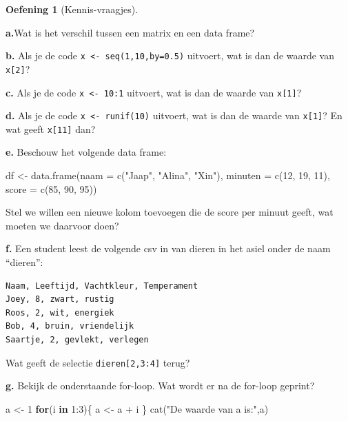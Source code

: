 \documentclass[
  a4paper,
]{scrbook}
\newenvironment{Shaded}{\begin{snugshade}}{\end{snugshade}}
\newcommand{\AttributeTok}[1]{\textcolor[rgb]{0.40,0.45,0.13}{#1}}
\newcommand{\ControlFlowTok}[1]{\textcolor[rgb]{0.00,0.23,0.31}{\textbf{#1}}}
\newcommand{\DecValTok}[1]{\textcolor[rgb]{0.68,0.00,0.00}{#1}}
\newcommand{\FunctionTok}[1]{\textcolor[rgb]{0.28,0.35,0.67}{#1}}
\newcommand{\NormalTok}[1]{\textcolor[rgb]{0.00,0.23,0.31}{#1}}
\newcommand{\OtherTok}[1]{\textcolor[rgb]{0.00,0.23,0.31}{#1}}
\newcommand{\SpecialCharTok}[1]{\textcolor[rgb]{0.37,0.37,0.37}{#1}}
\newcommand{\StringTok}[1]{\textcolor[rgb]{0.13,0.47,0.30}{#1}}
\theoremstyle{definition}
\newtheorem{exercise}{Oefening}[chapter]
\theoremstyle{remark}
\begin{document}
\begin{exercise}[Kennis-vraagjes]\protect\hypertarget{exr-R-1}{}\label{exr-R-1}

\textbf{a.}Wat is het verschil tussen een matrix en een data frame?

\textbf{b.} Als je de code \texttt{x\ \textless{}-\ seq(1,10,by=0.5)}
uitvoert, wat is dan de waarde van \texttt{x{[}2{]}}?

\textbf{c.} Als je de code \texttt{x\ \textless{}-\ 10:1} uitvoert, wat
is dan de waarde van \texttt{x{[}1{]}}?

\textbf{d.} Als je de code \texttt{x\ \textless{}-\ runif(10)} uitvoert,
wat is dan de waarde van \texttt{x{[}1{]}}? En wat geeft
\texttt{x{[}11{]}} dan?

\textbf{e.} Beschouw het volgende data frame:

\begin{Shaded}
\begin{Highlighting}[]
\NormalTok{df }\OtherTok{\textless{}{-}} \FunctionTok{data.frame}\NormalTok{(}\AttributeTok{naam =} \FunctionTok{c}\NormalTok{(}\StringTok{"Jaap"}\NormalTok{, }\StringTok{"Alina"}\NormalTok{, }\StringTok{"Xin"}\NormalTok{),}
                 \AttributeTok{minuten =} \FunctionTok{c}\NormalTok{(}\DecValTok{12}\NormalTok{, }\DecValTok{19}\NormalTok{, }\DecValTok{11}\NormalTok{), }
                 \AttributeTok{score =} \FunctionTok{c}\NormalTok{(}\DecValTok{85}\NormalTok{, }\DecValTok{90}\NormalTok{, }\DecValTok{95}\NormalTok{))}
\end{Highlighting}
\end{Shaded}

Stel we willen een nieuwe kolom toevoegen die de score per minuut geeft,
wat moeten we daarvoor doen?

\textbf{f.} Een student leest de volgende csv in van dieren in het asiel
onder de naam ``dieren'':

\begin{verbatim}
Naam, Leeftijd, Vachtkleur, Temperament
Joey, 8, zwart, rustig
Roos, 2, wit, energiek
Bob, 4, bruin, vriendelijk
Saartje, 2, gevlekt, verlegen
\end{verbatim}

Wat geeft de selectie \texttt{dieren{[}2,3:4{]}} terug?

\textbf{g.} Bekijk de onderstaande for-loop. Wat wordt er na de for-loop
geprint?

\begin{Shaded}
\begin{Highlighting}[]
\NormalTok{a }\OtherTok{\textless{}{-}} \DecValTok{1}
\ControlFlowTok{for}\NormalTok{(i }\ControlFlowTok{in} \DecValTok{1}\SpecialCharTok{:}\DecValTok{3}\NormalTok{)\{}
\NormalTok{  a }\OtherTok{\textless{}{-}}\NormalTok{ a }\SpecialCharTok{+}\NormalTok{ i}
\NormalTok{\}}
\FunctionTok{cat}\NormalTok{(}\StringTok{"De waarde van a is:"}\NormalTok{,a)}
\end{Highlighting}
\end{Shaded}

\end{exercise}
\end{document}
